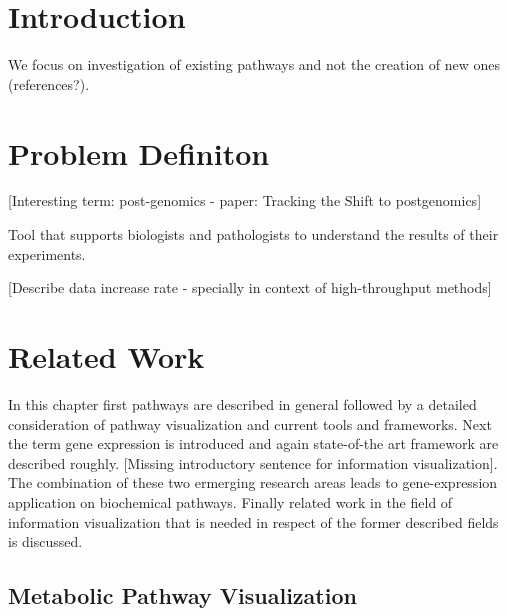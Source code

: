 \chapter{Introduction}

We focus on investigation of existing pathways and not the creation of new ones (references?).

\chapter{Problem Definiton}

[Interesting term: post-genomics - paper: Tracking the Shift to postgenomics]

Tool that supports biologists and pathologists to understand the results of their experiments.


[Describe data increase rate - specially in context of high-throughput methods]

\chapter{Related Work}

In this chapter first pathways are described in general followed by a detailed consideration of pathway visualization and current tools and frameworks. Next the term gene expression is introduced and again state-of-the art framework are described roughly. [Missing introductory sentence for information visualization]. The combination of these two ermerging research areas leads to gene-expression application on biochemical pathways. Finally related work in the field of information visualization that is needed in respect of the former described fields is discussed.

\section{Metabolic Pathway Visualization}

